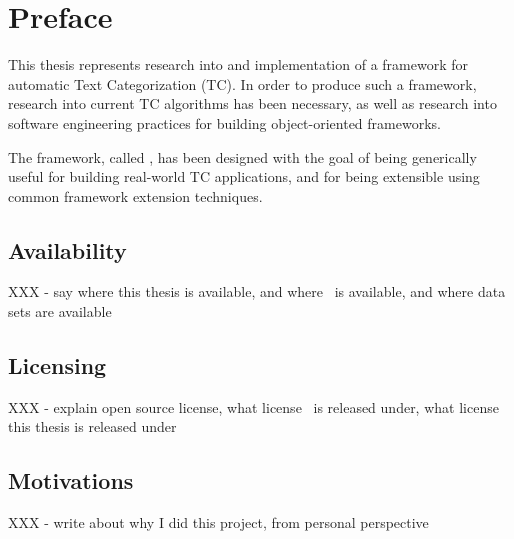 \chapter*{Preface}

This thesis represents research into and implementation of a framework
for automatic Text Categorization (TC).  In order to produce such a
framework, research into current TC algorithms has been necessary, as
well as research into software engineering practices for building
object-oriented frameworks.

The framework, called \aicat, has been designed with the goal of being
generically useful for building real-world TC applications, and for
being extensible using common framework extension techniques.

\section{Availability}

XXX - say where this thesis is available, and where \aicat\ is
available, and where data sets are available

\section{Licensing}

XXX - explain open source license, what license \aicat\ is released
under, what license this thesis is released under

\section{Motivations}

XXX - write about why I did this project, from personal perspective
